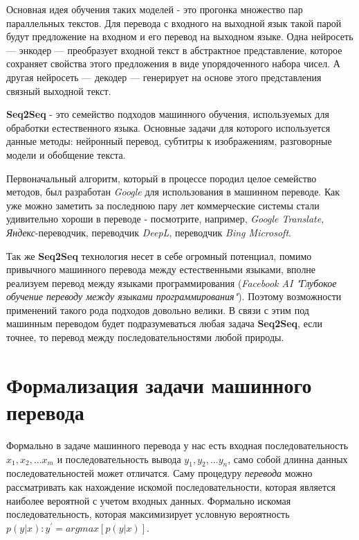     Основная идея обучения таких моделей - это прогонка множество пар параллельных текстов. Для перевода с входного на выходной язык такой парой будут предложение на входном и его перевод на выходном языке. Одна нейросеть — энкодер — преобразует входной текст в абстрактное представление, которое сохраняет свойства этого предложения в виде упорядоченного набора чисел. А другая нейросеть — декодер — генерирует на основе этого представления связный выходной текст.
	
	\textbf{Seq2Seq} - это семейство подходов машинного обучения, используемых для обработки естественного языка. Основные задачи для которого используется данные методы: нейронный перевод, субтитры к изображениям, разговорные модели и обобщение текста.
	
	Первоначальный алгоритм, который в процессе породил целое семейство методов, был разработан \textit{Google} для использования в машинном переводе. Как уже можно заметить за последнюю пару лет коммерческие системы стали удивительно хороши в  переводе - посмотрите, например, \textit{Google Translate}, \textit{Яндекс}-переводчик, переводчик \textit{DeepL}, переводчик \textit{Bing Microsoft}.
	
	Так же \textbf{Seq2Seq} технология несет в себе огромный потенциал, помимо привычного машинного перевода между естественными языками, вполне реализуем перевод между языками программирования (\textit{Facebook AI "Глубокое обучение переводу между языками программирования"}). Поэтому возможности применений такого рода подходов довольно велики. В связи с этим под машинным переводом будет подразумеваться любая задача \textbf{Seq2Seq}, если точнее, то перевод между последовательностями любой природы.
	
	\clearpage
	
	\section{Формализация задачи машинного перевода}
	
	Формально в задаче машинного перевода у нас есть входная последовательность $x_{1}, x_{2}, ... x_{m}$ и последовательность вывода $y_{1}, y_{2}, ... y_{n}$, само собой длинна данных последовательностей может отличатся. Саму процедуру \textit{перевода} можно рассматривать как нахождение искомой последовательности, которая является наиболее вероятной с учетом входных данных. Формально искомая последовательность, которая максимизирует условную вероятность $p(y|x): y^{'} = argmax[p(y|x)]$.
	
